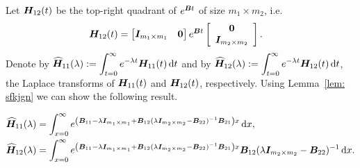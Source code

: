 Let \(\boldsymbol H_{12}(t)\) be the top-right quadrant of \(e^{\boldsymbol Bt}\) of size \(m_1\times m_2\), i.e.
\begin{align}
	\boldsymbol H_{12}(t) &= \begin{bmatrix}   \boldsymbol I_{m_1\times m_1} & \boldsymbol 0 \end{bmatrix}e^{\boldsymbol Bt} \left[\begin{array}{c} \boldsymbol 0 \\ \boldsymbol I_{m_2\times m_2}\end{array}\right]. \label{eqn: p03j}
\end{align}
Denote by \(\widehat{\boldsymbol H}_{11}(\lambda):=\displaystyle \int_{t=0}^\infty e^{-\lambda t}\boldsymbol H_{11}(t)\, \mathrm{d} t\) and by \(\widehat{\boldsymbol H}_{12}(\lambda):=\displaystyle \int_{t=0}^\infty e^{-\lambda t}\boldsymbol H_{12}(t)\, \mathrm{d} t\), the Laplace transforms of \(\boldsymbol H_{11}(t)\) and \(\boldsymbol H_{12}(t)\), respectively. Using Lemma~\ref{lem: sfkjgn} we can show the following result. 
\begin{lem}
	\begin{align}
		\widehat{\boldsymbol H}_{11}(\lambda) &= \int_{x=0}^\infty e^{\left(\boldsymbol B_{11} -\lambda \boldsymbol I_{m_1\times m_1} + \boldsymbol B_{12}(\lambda \boldsymbol I_{m_2\times m_2}- \boldsymbol B_{22})^{-1}\boldsymbol B_{21}\right)x} \, \mathrm{d} x,\label{eqn: 202}
		\\\widehat{\boldsymbol H}_{12}(\lambda) &= \int_{x=0}^\infty e^{\left(\boldsymbol B_{11} -\lambda \boldsymbol I_{m_1\times m_1} + \boldsymbol B_{12}(\lambda \boldsymbol I_{m_2\times m_2}- \boldsymbol B_{22})^{-1}\boldsymbol B_{21}\right)x} \boldsymbol B_{12}(\lambda \boldsymbol I_{m_2\times m_2}-\boldsymbol B_{22})^{-1}\, \mathrm{d} x.\label{eqn: 203}
	\end{align}
\end{lem}
